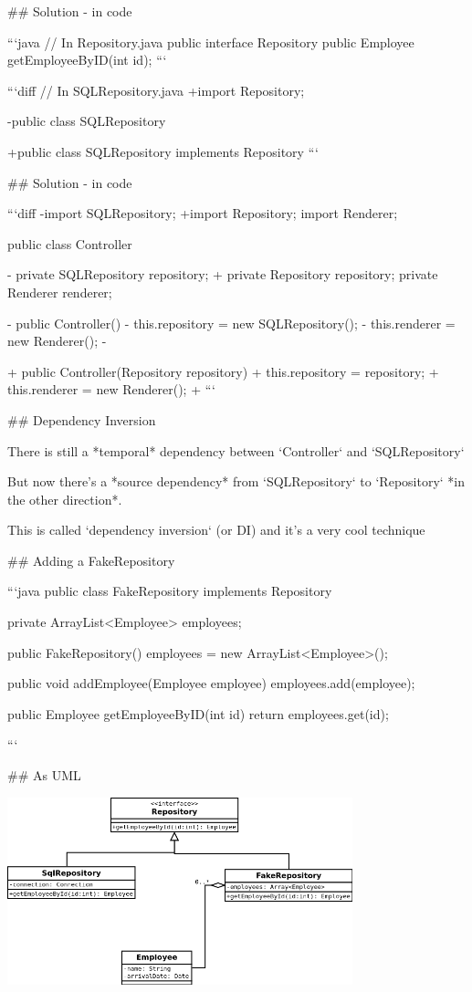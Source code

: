## Solution - in code

```java
// In Repository.java
public interface Repository {
    public Employee getEmployeeByID(int id);
}
```

```diff
// In SQLRepository.java
+import Repository;

-public class SQLRepository {
+public class SQLRepository implements Repository {
}
```

## Solution - in code

```diff
-import SQLRepository;
+import Repository;
 import Renderer;

 public class Controller {
-    private SQLRepository repository;
+    private Repository repository;
     private Renderer renderer;

-    public Controller() {
-        this.repository = new SQLRepository();
-        this.renderer = new Renderer();
-   }

+    public Controller(Repository repository) {
+        this.repository = repository;
+        this.renderer = new Renderer();
+    }
```

## Dependency Inversion

There is still a *temporal* dependency between `Controller` and `SQLRepository`

But now there's a *source dependency* from `SQLRepository` to `Repository`
*in the other direction*.

This is called `dependency inversion` (or DI) and it's a very cool technique


## Adding a FakeRepository

```java
public class FakeRepository implements Repository {
    private ArrayList<Employee> employees;

    public FakeRepository() {
        employees = new ArrayList<Employee>();
    }

    public void addEmployee(Employee employee) {
        employees.add(employee);
    }

    public Employee getEmployeeByID(int id) {
        return employees.get(id);
    }
}
```

## As UML


\includegraphics[width=10cm]{img/uml/employee-render-3.png}

}}
